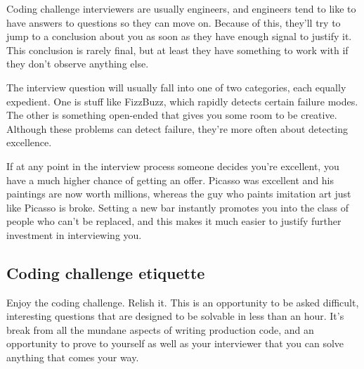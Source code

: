 \documentclass{article}
\begin{document}
  Coding challenge interviewers are usually engineers, and engineers tend to
  like to have answers to questions so they can move on. Because of this,
  they'll try to jump to a conclusion about you as soon as they have enough
  signal to justify it. This conclusion is rarely final, but at least they have
  something to work with if they don't observe anything else.

  The interview question will usually fall into one of two categories, each
  equally expedient. One is stuff like FizzBuzz, which rapidly detects certain
  failure modes. The other is something open-ended that gives you some room to
  be creative. Although these problems can detect failure, they're more often
  about detecting excellence.

  If at any point in the interview process someone decides you're excellent,
  you have a much higher chance of getting an offer. Picasso was excellent and
  his paintings are now worth millions, whereas the guy who paints imitation
  art just like Picasso is broke. Setting a new bar instantly promotes you into
  the class of people who can't be replaced, and this makes it much easier to
  justify further investment in interviewing you.

\subsection{Coding challenge etiquette}
    Enjoy the coding challenge. Relish it. This is an opportunity to be asked
    difficult, interesting questions that are designed to be solvable in less
    than an hour. It's break from all the mundane aspects of writing production
    code, and an opportunity to prove to yourself as well as your interviewer
    that you can solve anything that comes your way.
\end{document}
